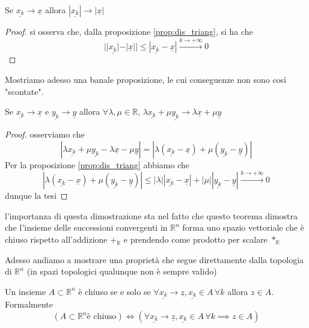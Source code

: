 \documentclass[openany, italian]{book}
\begin{document}
\begin{prop}
Se $\underline{x_k} \to \underline{x}$ allora $|\underline{x_k}| \to |\underline{x}|$
\end{prop}
\begin{proof}
si osserva che, dalla proposizione \ref{prop:dis_triang}, si ha che
$$
||\underline{x_k}| - |\underline{x}|| \leq |\underline{x_k} - \underline{x}| \stackrel{k \to +\infty}{\to} 0
$$
\end{proof}
\noindent Mostriamo adesso una banale proposizione, le cui conseguenze non sono così "scontate".
\begin{prop}
Se $\underline{x_k} \to \underline{x}$ e $\underline{y_k} \to \underline{y}$ allora $\forall \lambda, \mu \in \mathbb{R}, \, \lambda \underline{x_k} + \mu \underline{y_k} \to \lambda \underline{x} + \mu \underline{y}$ 
\end{prop}
\begin{proof}
osserviamo che
$$
|\lambda \underline{x_k} + \mu \underline{y_k} - \lambda \underline{x} - \mu \underline{y}| = |\lambda (\underline{x_k} - \underline{x}) + \mu (\underline{y_k} - \underline{y})|
$$
Per la proposizione \ref{prop:dis_triang} abbiamo che
$$
|\lambda (\underline{x_k} - \underline{x}) + \mu (\underline{y_k} - \underline{y})| \leq |\lambda| |\underline{x_k} - \underline{x}| + |\mu| |\underline{y_k} - \underline{y}| \stackrel{k \to +\infty}{\to} 0
$$
dunque la tesi
\end{proof}
\begin{remark}
l'importanza di questa dimostrazione sta nel fatto che questo teorema dimostra che l'insieme delle successioni convergenti in $\mathbb{R}^n$ forma uno spazio vettoriale che è chiuso rispetto all'addizione $+_{\mathbb{R}}$ e prendendo come prodotto per scalare $*_\mathbb{R}$
\end{remark}
\noindent Adesso andiamo a mostrare una proprietà che segue direttamente dalla topologia di $\mathbb{R}^n$ (in spazi topologici qualunque non è sempre valido)
\begin{prop}
	Un insieme $A \subset \mathbb{R}^n$ è chiuso se e solo se $\forall \underline{x_k} \to \underline{z}, \underline{x_k} \in A \, \forall k$ allora $z \in A$. Formalmente
	$$
	(A \subset \mathbb{R}^n \text{è chiuso}) \iff (\forall \underline{x_k} \to \underline{z}, \underline{x_k} \in A \, \forall k \implies z \in A) 
	$$
	\label{prop:caratt_chiusi}
\end{prop}
\end{document}
